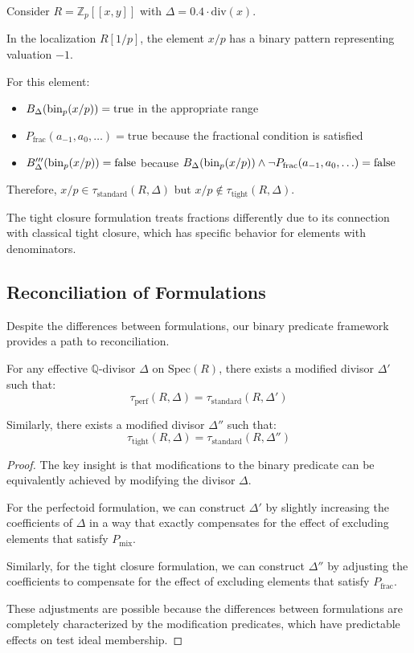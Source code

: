 \begin{example}\label{ex:tight-standard}
Consider $R = \mathbb{Z}_p[[x,y]]$ with $\Delta = 0.4 \cdot \text{div}(x)$.

In the localization $R[1/p]$, the element $x/p$ has a binary pattern representing valuation $-1$.

For this element:
\begin{itemize}
    \item $B_\Delta(\operatorname{bin}_p(x/p)) = \text{true}$ in the appropriate range
    \item $P_{\text{frac}}(a_{-1}, a_0, \ldots) = \text{true}$ because the fractional condition is satisfied
    \item $B'''_\Delta(\operatorname{bin}_p(x/p)) = \text{false}$ because $B_\Delta(\operatorname{bin}_p(x/p)) \wedge \neg P_{\text{frac}}(a_{-1}, a_0, \ldots) = \text{false}$
\end{itemize}

Therefore, $x/p \in \tau_{\text{standard}}(R,\Delta)$ but $x/p \notin \tau_{\text{tight}}(R,\Delta)$.

The tight closure formulation treats fractions differently due to its connection with classical tight closure, which has specific behavior for elements with denominators.
\end{example}

\subsection{Reconciliation of Formulations}

Despite the differences between formulations, our binary predicate framework provides a path to reconciliation.

\begin{corollary}\label{cor:reconciliation}
For any effective $\mathbb{Q}$-divisor $\Delta$ on $\text{Spec}(R)$, there exists a modified divisor $\Delta'$ such that:
$$\tau_{\text{perf}}(R,\Delta) = \tau_{\text{standard}}(R,\Delta')$$

Similarly, there exists a modified divisor $\Delta''$ such that:
$$\tau_{\text{tight}}(R,\Delta) = \tau_{\text{standard}}(R,\Delta'')$$
\end{corollary}

\begin{proof}
The key insight is that modifications to the binary predicate can be equivalently achieved by modifying the divisor $\Delta$.

For the perfectoid formulation, we can construct $\Delta'$ by slightly increasing the coefficients of $\Delta$ in a way that exactly compensates for the effect of excluding elements that satisfy $P_{\text{mix}}$.

Similarly, for the tight closure formulation, we can construct $\Delta''$ by adjusting the coefficients to compensate for the effect of excluding elements that satisfy $P_{\text{frac}}$.

These adjustments are possible because the differences between formulations are completely characterized by the modification predicates, which have predictable effects on test ideal membership.
\end{proof}

